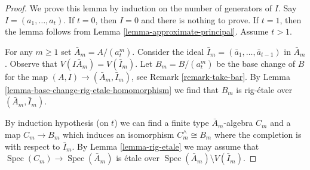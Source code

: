 \documentclass{stacks-project}
\theoremstyle{plain}
\theoremstyle{definition}
\theoremstyle{remark}
\numberwithin{equation}{subsection}
\def\Spec{\mathop{\mathrm{Spec}}}
\begin{document}
\begin{proof}
We prove this lemma by induction on the number of generators of $I$.
Say $I = (a_1, \ldots, a_t)$. If $t = 0$, then $I = 0$ and there
is nothing to prove. If $t = 1$, then the lemma follows from
Lemma \ref{lemma-approximate-principal}. Assume $t > 1$.

\medskip\noindent
For any $m \geq 1$ set $\bar A_m = A/(a_t^m)$. Consider the ideal
$\bar I_m = (\bar a_1, \ldots, \bar a_{t - 1})$ in $\bar A_m$.
Observe that $V(I \bar A_m) = V(\bar I_m)$.
Let $B_m = B/(a_t^m)$ be the base change of $B$ for the
map $(A, I) \to (\bar A_m, \bar I_m)$, see Remark \ref{remark-take-bar}.
By Lemma \ref{lemma-base-change-rig-etale-homomorphism}
we find that $B_m$ is rig-\'etale over $(\bar A_m, \bar I_m)$.

\medskip\noindent
By induction hypothesis (on $t$) we can find a finite type
$\bar A_m$-algebra $C_m$ and a map $C_m \to B_m$ which induces an
isomorphism $C_m^\wedge \cong B_m$
where the completion is with respect to $\bar I_m$.
By Lemma \ref{lemma-rig-etale} we may assume that
$\Spec(C_m) \to \Spec(\bar A_m)$ is \'etale
over $\Spec(\bar A_m) \setminus V(\bar I_m)$.


\end{proof}
\end{document}
